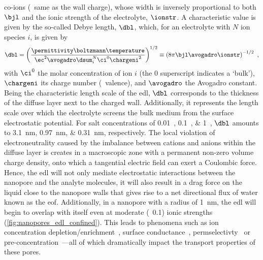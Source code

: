 co-ions (\ie~same as the wall charge), whose width is inversely proportional to both $\bjl$ and the ionic
strength of the electrolyte, $\ionstr$. A characteristic value is given by the so-called Debye length, $\dbl$,
which, for an electrolyte with $N$ ion species $i$, is given by~\cite{Bocquet-2010}
%
\begin{equation}\label{eq:nanopores_debye_length}
  \dbl = \left(
          \dfrac{ \permittivity \boltzmann \temperature }%
                { \ec^2 \avogadro \dsum_i^N \ci^0 \chargeni^2 } \right)^{1/2}
       \equiv \left( 8 \pi \bjl \avogadro \ionstr \right)^{-1/2}
  \text{ ,}
\end{equation}
%
with $\ci^0$ the molar concentration of ion $i$ (the $0$ superscript indicates a `bulk'), $\chargeni$ its
charge number (\ie~valence), and $\avogadro$ the Avogadro constant. Being the characteristic length scale of
the \gls{edl}, $\dbl$ corresponds to the thickness of the diffuse layer next to the charged wall.
Additionally, it represents the length scale over which the electrolyte screens the bulk medium from the
surface electrostatic potential. For salt concentrations of \SIlist{0.01;0.1;1}{\Molar}, $\dbl$ amounts to
\SIlist{3.1;0.97;0.31}{\nm}, respectively. The local violation of electroneutrality caused by the imbalance
between cations and anions within the diffuse layer is creates in a macroscopic zone with a permanent non-zero
volume charge density, onto which a tangential electric field can exert a Coulombic force. Hence, the
\gls{edl} will not only mediate electrostatic interactions between the nanopore and the analyte molecules, it
will also result in a drag force on the liquid close to the nanopore walls that gives rise to a net
directional flux of water known as the \gls{eof}. Additionally, in a nanopore with a radius of \SI{1}{\nm},
the \gls{edl} will begin to overlap with itself even at moderate (\eg~\SI{0.1}{\Molar}) ionic strengths
(\cref{fig:nanopores_edl_confined}). This leads to phenomena such as ion concentration
depletion/enrichment~\cite{Plecis-2005}, surface conductance~\cite{Stein-2004},
permselectivty~\cite{Plecis-2005} or pre-concentration~\cite{Pu-2004}---all of which dramatically impact the
transport properties of these pores.

